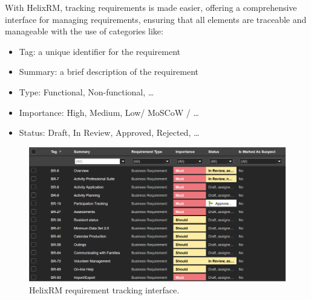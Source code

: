 With HelixRM, tracking requirements is made easier, offering a
comprehensive interface for managing requirements,
ensuring that all elements are traceable and manageable with the use of categories like:
\begin{itemize}
    \item Tag: a unique identifier for the requirement
    \item Summary: a brief description of the requirement
    \item Type: Functional, Non-functional, \ldots
    \item Importance: High, Medium, Low/ MoSCoW / \ldots
    \item Status: Draft, In Review, Approved, Rejected, \ldots
\end{itemize}

\begin{figure}[htbp]
    \centerline{
        \includegraphics[width=\linewidth]
        {images/requirement-tracking}
    }
    \caption{HelixRM requirement tracking interface.}
    \label{fig:fig}
\end{figure}


